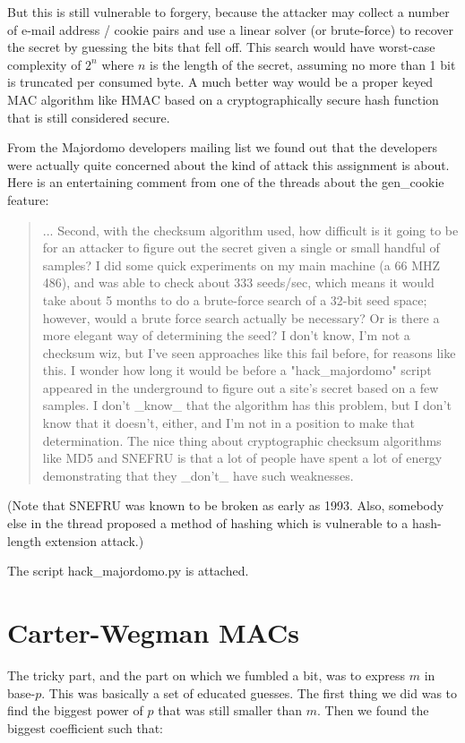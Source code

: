 \documentclass{article}
\begin{document}
But this is still vulnerable to forgery, because the attacker may collect a number of e-mail address / cookie pairs and use a linear solver (or brute-force) to recover the secret by guessing the bits that fell off.
This search would have worst-case complexity of $2^n$ where $n$ is the length of the secret, assuming no more than 1 bit is truncated per consumed byte.
A much better way would be a proper keyed MAC algorithm like HMAC based on a cryptographically secure hash function that is still considered secure.

From the Majordomo developers mailing list we found out that the developers were actually quite concerned about the kind of attack this assignment is about.
Here is an entertaining comment from one of the threads about the gen\_cookie feature:
\begin{quotation}
	...
	Second, with the checksum algorithm used, how difficult is it going to be
	for an attacker to figure out the secret given a single or small handful of
	samples?  I did some quick experiments on my main machine (a 66 MHZ 486),
	and was able to check about 333 seeds/sec, which means it would take about
	5 months to do a brute-force search of a 32-bit seed space; however, would
	a brute force search actually be necessary?  Or is there a more elegant way
	of determining the seed?  I don't know, I'm not a checksum wiz, but I've
	seen approaches like this fail before, for reasons like this.  I wonder how
	long it would be before a "hack\_majordomo" script appeared in the
	underground to figure out a site's secret based on a few samples.  I don't
	\_know\_ that the algorithm has this problem, but I don't know that it
	doesn't, either, and I'm not in a position to make that determination.  The
	nice thing about cryptographic checksum algorithms like MD5 and SNEFRU is
	that a lot of people have spent a lot of energy demonstrating that they
	\_don't\_ have such weaknesses.
\end{quotation}
\cite{majordomo_thread}
(Note that SNEFRU was known to be broken as early as 1993. Also, somebody else in the thread proposed a method of hashing which is vulnerable to a hash-length extension attack.)

The script hack\_majordomo.py is attached.

\section{Carter-Wegman MACs}
The tricky part, and the part on which we fumbled a bit, was to express $m$ in base-$p$.
This was basically a set of educated guesses.
The first thing we did was to find the biggest power of $p$ that was still smaller than $m$.
Then we found the biggest coefficient such that:
\end{document}
